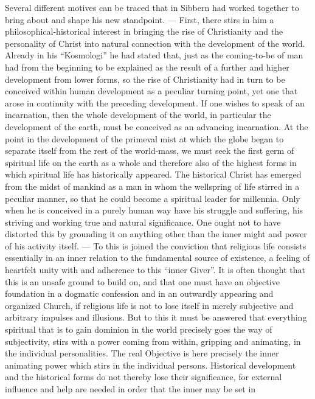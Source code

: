 \documentclass[12pt,a4paper,openany]{book}
\newcommand{\opage}[1]{\marginnote{\footnotesize\textit{[#1]}}}
\begin{document}
Several different motives can be traced that in Sibbern
had worked together to bring about and shape his new
standpoint. --- First, there stirs in him a
philosophical-historical interest in bringing the rise of Christianity
and the personality of Christ into natural connection with
the development of the world. Already in his ``Kosmologi'' he had
stated that, just as the coming-to-be of man had from the beginning to be
explained as the result of a further and higher development from
lower forms, so the rise of Christianity had in turn to
be conceived within human development as a peculiar turning point,
yet one that arose in continuity with the preceding development. If one
wishes to speak of an incarnation, then the whole
development of the world, in particular the development of the earth, must be conceived
as an advancing incarnation. At the point in the
development of the primeval mist at which the globe began to separate itself
\opage{94}from the rest of the world-mass, we must seek the first
germ of spiritual life on the earth as a whole and therefore
also of the highest forms in which spiritual life
has historically appeared. The historical Christ has emerged
from the midst of mankind as a man in whom the wellspring of life
stirred in a peculiar manner, so that he could become
a spiritual leader for millennia. Only when he is conceived in a
purely human way have his struggle and suffering, his
striving and working true and natural significance. One ought
not to have distorted this by grounding it on anything
other than the inner might and power of his activity itself. ---
To this is joined the conviction that religious life
consists essentially in an inner relation to the
fundamental source of existence, a feeling of heartfelt unity with and adherence to
this ``inner Giver''. It is often thought that this is an unsafe
ground to build on, and that one must have an objective
foundation in a dogmatic confession and in an outwardly appearing
and organized Church, if religious life is not to lose
itself in merely subjective and arbitrary impulses and illusions.
But to this it must be answered that everything spiritual that is to gain
dominion in the world precisely goes the way of subjectivity, stirs
with a power coming from within, gripping and animating,
in the individual personalities. The real Objective is
here precisely the inner animating power which stirs in the
individual persons. Historical development and the historical
forms do not thereby lose their significance, for external
influence and help are needed in order that the inner may be set in
\end{document}
